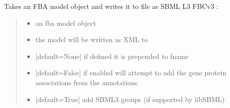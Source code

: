 \documentclass[letterpaper,12pt,english]{sphinxmanual}
\begin{document}
\begin{fulllineitems}

\pysigstartsignatures
\pysiglinewithargsret
{}
{\sphinxparamcomma {}\sphinxparamcomma {}\sphinxparamcomma {}\sphinxparamcomma {}\sphinxparamcomma {}\sphinxparamcomma {}\sphinxparamcomma {}\sphinxparamcomma {}\sphinxparamcomma {}\sphinxparamcomma {}}
{}
\pysigstopsignatures
\sphinxAtStartPar
Takes an FBA model object and writes it to file as SBML L3 FBCv3 :
\begin{quote}\begin{description}
\begin{itemize}
\item {} 
\sphinxAtStartPar
{} \textendash{} an fba model object

\item {} 
\sphinxAtStartPar
{} \textendash{} the model will be written as XML to 

\item {} 
\sphinxAtStartPar
{} \textendash{} {[}default=None{]} if defined it is prepended to fname

\item {} 
\sphinxAtStartPar
{} \textendash{} {[}default=False{]} if enabled will attempt to add the gene protein associations from the annotations

\item {} 
\sphinxAtStartPar
{} \textendash{} {[}default=True{]} add SBML3 groups (if supported by libSBML)


\end{itemize}
\end{description}
\end{quote}
\end{fulllineitems}
\end{document}

